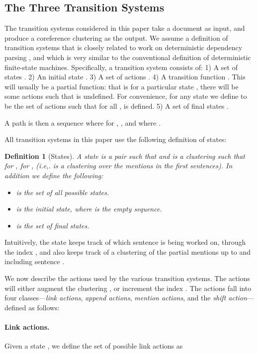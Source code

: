 \documentclass[11pt,a4paper]{article}
\newtheorem{definition}{Definition}
\begin{document}
\subsection{The Three Transition Systems}
\label{sec:three-systems}

The transition systems considered in this paper take a document  as input, and produce a coreference clustering  as the output. We  assume a definition of transition systems that is closely related to work on deterministic dependency parsing \cite{nivre-2003-efficient,nivre-2008-algorithms}, and which is very similar to the conventional definition of deterministic finite-state machines. Specifically, a transition system consists of: 1) A set of states . 2) An initial state . 3) A  set of actions . 4) A transition function . This will usually be a partial function: that is for a particular state , there will be some actions  such that  is undefined. For convenience, for any state  we define  to be the set of actions such that for all ,  is defined. 5) A set of final states .

A path is then a sequence  where for , , and where .

All transition systems in this paper use the following definition of states:
\begin{definition}[States]
\label{defn:states}
A state is a pair  such that  and  is a clustering such that for , for ,  (i.e,.  is a clustering over the mentions in the first  sentences). In addition we define the following:

\begin{itemize}
    \item   is the set of all possible states.
    \item  is the initial state, where  is the empty sequence.
    \item  is the set of final states.
\end{itemize}
\end{definition}
Intuitively, the state  keeps track of which sentence is being worked on, through the index , and also keeps track of a clustering of the partial mentions up to and including sentence . 

We now describe the actions used by the various transition systems. The actions will either augment the clustering , or increment the index . The actions fall into four classes---{\em link actions}, {\em append actions}, {\em mention actions}, and the {\em shift action}---defined as follows:


\paragraph{Link actions.}
Given a state , we define the set of possible link actions as
\end{document}
